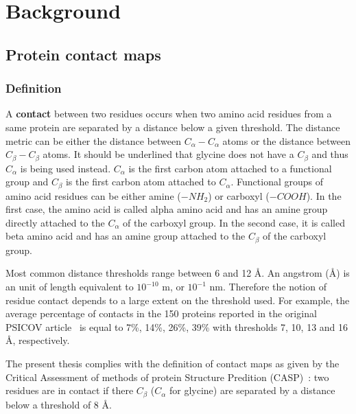 \chapter{Background}

\section{Protein contact maps}

    \subsection{Definition}

        A \textbf{contact} between two residues occurs when two amino acid residues from
        a same protein are separated by a distance below a given threshold.
        The distance metric can be either the distance between $C_{\alpha}-C_{\alpha}$
        atoms or the distance between $C_{\beta}-C_{\beta}$ atoms.
        It should be underlined that glycine does not have a $C_{\beta}$ and thus $C_{\alpha}$ is
        being used instead.
        $C_{\alpha}$ is the first carbon atom attached to a functional group and $C_{\beta}$ is the first carbon atom attached to $C_{\alpha}$.
        Functional groups of amino acid residues can be either
        amine ($-NH_2$) or carboxyl ($-COOH$). In the first case, the amino acid is called alpha amino acid and has an amine group
        directly attached to the $C_{\alpha}$ of the carboxyl group. In the second case, it is called beta amino acid and has an amine group attached to
        the $C_{\beta}$ of the carboxyl group.

        Most common distance thresholds range between 6 and 12 \AA{}. An angstrom (\AA{}) is an unit of length equivalent to $10^{-10}$ m, or $10^{-1}$ nm.
        Therefore the notion of residue contact depends to a large extent on the threshold used.
        For example, the average percentage of contacts in the 150 proteins reported in the original PSICOV
        article~\cite{doi:10.1093/bioinformatics/btr638}
        is equal to 7\%, 14\%, 26\%, 39\% with thresholds 7, 10, 13 and 16 \AA{}, respectively.

        The present thesis complies with the definition of contact maps as given by the
        Critical Assessment of methods of protein Structure Predition (CASP)~\cite{ezkurdia2009assessment}:
        two residues are in contact if there $C_{\beta}$ ($C_{\alpha}$ for glycine) are separated by a distance
        below a threshold of 8 \AA{}.

